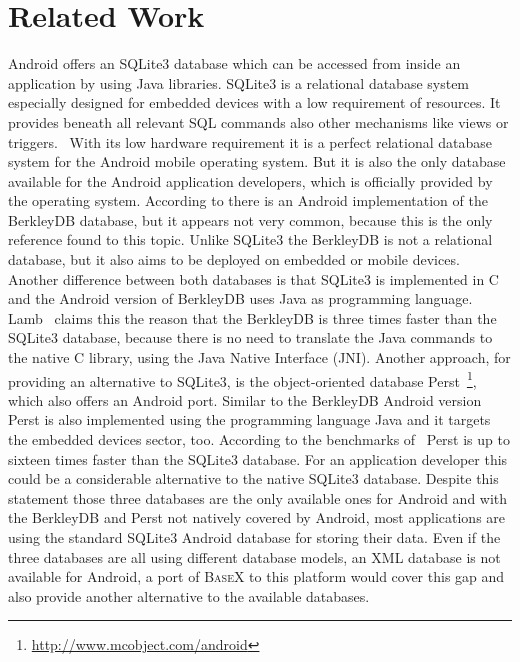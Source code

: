 



\section{Related Work}
\label{sec:overview:related-work}
Android offers an SQLite3 database which can be accessed from inside an application by using Java libraries.
SQLite3 is a relational database system especially designed for embedded devices with a low requirement of resources.
It provides beneath all relevant SQL commands also other mechanisms like views or triggers.~\cite{owens2006definitive}
With its low hardware requirement it is a perfect relational database system for the Android mobile operating system.
But it is also the only database available for the Android application developers, which is officially provided by the operating system.
According to \cite{lamb2010berkleydb} there is an Android implementation of the BerkleyDB database, but it appears not very common, because this is the only reference found to this topic.
Unlike SQLite3 the BerkleyDB is not a relational database, but it also aims to be deployed on embedded or mobile devices.
Another difference between both databases is that SQLite3 is implemented in C and the Android version of BerkleyDB uses Java as programming language.
Lamb~\cite{lamb2010berkleydb} claims this the reason that the BerkleyDB is three times faster than the SQLite3 database, because there is no need to translate the Java commands to the native C library, using the Java Native Interface (JNI).
Another approach, for providing an alternative to SQLite3, is the object-oriented database Perst~\footnote{\url{http://www.mcobject.com/android}}, which also offers an Android port.
Similar to the BerkleyDB Android version Perst is also implemented using the programming language Java and it targets the embedded devices sector, too.
According to the benchmarks of~\cite{perst-bench} Perst is up to sixteen times faster than the SQLite3 database.
For an application developer this could be a considerable alternative to the native SQLite3 database.
Despite this statement those three databases are the only available ones for Android and with the BerkleyDB and Perst not natively covered by Android, most applications are using the standard SQLite3 Android database for storing their data.
Even if the three databases are all using different database models, an XML database is not available for Android, a port of \textsc{BaseX} to this platform would cover this gap and also provide another alternative to the available databases.\\
